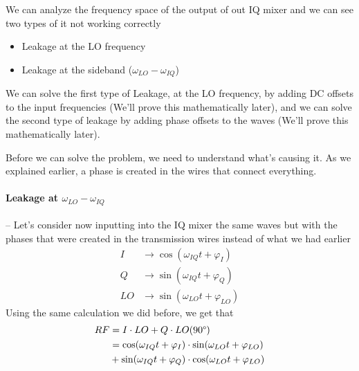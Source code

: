 We can analyze the frequency space of the output of out IQ mixer and we can see two types of it not working correctly
\begin{itemize}
  \item Leakage at the LO frequency
  \item Leakage at the sideband ($\omega_{LO} - \omega_{IQ}$)
\end{itemize}
We can solve the first type of Leakage, at the LO frequency, by adding DC offsets to the input frequencies (We'll prove this mathematically later), and we can solve the second type of leakage by adding phase offsets to the waves (We'll prove this mathematically later).


Before we can solve the problem, we need to understand what's causing it. As we explained earlier, a phase  is created  in the wires that connect everything.
\paragraph*{Leakage at $\omega_{LO} - \omega_{IQ}$ }--\quad
Let's consider now inputting into the IQ mixer the same waves but with the phases that were created in the transmission wires instead of what we had earlier
\begin{align*}
    I &\longrightarrow \cos (\omega_{IQ} t + \varphi_I) \\%
    Q &\longrightarrow \sin (\omega_{IQ} t + \varphi_Q) \\%
    LO &\longrightarrow \sin (\omega_{LO}t + \varphi_{LO})
\end{align*}
Using the same calculation we did before, we get that
\begin{align*}
RF &= I\cdot LO + Q\cdot LO (90\degree) \\
   &= \cos (\omega_{IQ} t + \varphi_I) \cdot \sin (\omega_{LO}t + \varphi_{LO})\\
   &+ \sin (\omega_{IQ} t + \varphi_Q) \cdot \cos (\omega_{LO}t + \varphi_{LO}) 
\end{align*}

